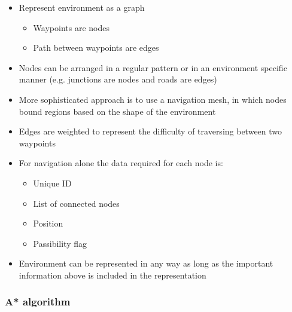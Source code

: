 \documentclass[a4paper]{article}
\begin{document}
\begin{itemize}
  \item
    Represent environment as a graph
    \begin{itemize}
      \item
        Waypoints are nodes

      \item
        Path between waypoints are edges

    \end{itemize}

  \item
    Nodes can be arranged in a regular pattern or in an environment specific
    manner (e.g. junctions are nodes and roads are edges)

  \item
    More sophisticated approach is to use a navigation mesh, in which nodes
    bound regions based on the shape of the environment

  \item
    Edges are weighted to represent the difficulty of traversing between two
    waypoints

  \item
    For navigation alone the data required for each node is:
    \begin{itemize}
      \item
        Unique ID

      \item
        List of connected nodes

      \item
        Position

      \item
        Passibility flag

    \end{itemize}

  \item
    Environment can be represented in any way as long as the important
    information above is included in the representation

\end{itemize}

\subsubsection{A* algorithm}
\end{document}
